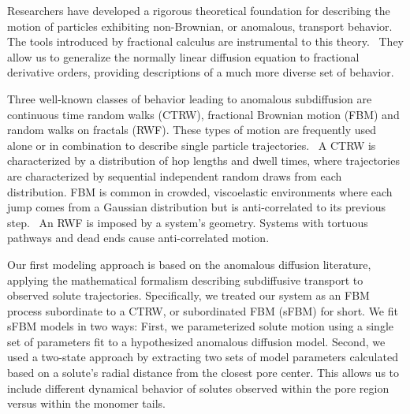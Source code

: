 \documentclass{article}
\begin{document}
  Researchers have developed a rigorous theoretical foundation for describing the 
  motion of particles exhibiting non-Brownian, or anomalous, transport behavior.
  \cite{metzler_random_2000,bouchaud_anomalous_1990} The tools introduced by 
  fractional calculus are instrumental to this theory.~\cite{gorenflo_fractional_1997}
  They allow us to generalize the normally linear diffusion equation to fractional
  derivative orders, providing descriptions of a much more diverse set of behavior.~\cite{klages_anomalous_2008}

  Three well-known classes of behavior leading to anomalous subdiffusion are 
  continuous time random walks (CTRW), fractional Brownian motion
  (FBM) and random walks on fractals (RWF).\cite{meroz_toolbox_2015}
  These types of motion are frequently used alone or in combination to describe
  single particle trajectories.~\cite{morrin_three_2018,metzler_anomalous_2014}
  A CTRW is characterized by a distribution of hop lengths and dwell times, 
  where trajectories are characterized by sequential independent random draws from 
  each distribution.\cite{montroll_random_1965} FBM is common in crowded,
  viscoelastic environments where each jump comes from a Gaussian distribution
  but is anti-correlated to its previous step.~\cite{mandelbrot_fractional_1968,jeon_fractional_2010,banks_anomalous_2005}
  An RWF is imposed by a system's geometry. Systems with tortuous pathways 
  and dead ends cause anti-correlated motion.\cite{meroz_toolbox_2015,neusius_subdiffusion_2008}

  Our first modeling approach is based on the anomalous diffusion literature, 
  applying the mathematical formalism describing subdiffusive transport to observed
  solute trajectories. Specifically, we treated our system as an FBM process subordinate
  to a CTRW, or subordinated FBM (sFBM) for short. We fit sFBM
  models in two ways: First, we parameterized solute motion using a single set of parameters fit
  to a hypothesized anomalous diffusion model. Second, we used a two-state approach
  by extracting two sets of model parameters calculated based on a solute's radial
  distance from the closest pore center. This allows us to include different dynamical
  behavior of solutes observed within the pore region versus within the monomer tails.
  
\end{document}
